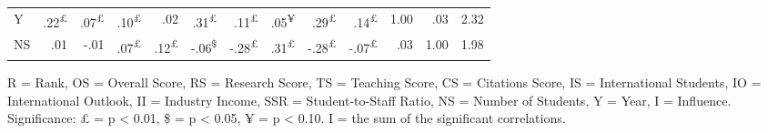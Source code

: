 \documentclass{singlecol-new}
\theoremstyle{TH}{
\newtheorem{lemma}{Lemma}
\newtheorem{theorem}[lemma]{Theorem}
\newtheorem{corrolary}[lemma]{Corrolary}
\newtheorem{conjecture}[lemma]{Conjecture}
\newtheorem{proposition}[lemma]{Proposition}
\newtheorem{claim}[lemma]{Claim}
\newtheorem{stheorem}[lemma]{Wrong Theorem}
\newtheorem{algorithm}{Algorithm}
}
\theoremstyle{THrm}{
\newtheorem{definition}{Definition}[section]
\newtheorem{question}{Question}[section]
\newtheorem{remark}{Remark}
\newtheorem{scheme}{Scheme}
}
\theoremstyle{THhit}{
\newtheorem{case}{Case}[section]
}
\begin{document}
\begin{table*}[h!]
\begin{tabular}{lrrrrrrrrrrrr}
		Y & \cellcolor{gray!11}.22\textsuperscript{£} & \cellcolor{gray!3}.07\textsuperscript{£} & \cellcolor{gray!5}.10\textsuperscript{£} & \cellcolor{gray!1}.02 & \cellcolor{gray!15}.31\textsuperscript{£} & \cellcolor{gray!5}.11\textsuperscript{£} & \cellcolor{gray!2}.05\textsuperscript{¥} & \cellcolor{gray!14}.29\textsuperscript{£} & \cellcolor{gray!7}.14\textsuperscript{£} & \cellcolor{gray!50}1.00 & \cellcolor{gray!1}.03 & 2.32 \\ 
		
		NS & \cellcolor{gray!0}.01 & \cellcolor{gray!0}-.01 & \cellcolor{gray!3}.07\textsuperscript{£} & \cellcolor{gray!6}.12\textsuperscript{£} & \cellcolor{gray!3}-.06\textsuperscript{\$} & \cellcolor{gray!14}-.28\textsuperscript{£} & \cellcolor{gray!15}.31\textsuperscript{£} & \cellcolor{gray!14}-.28\textsuperscript{£} & \cellcolor{gray!3}-.07\textsuperscript{£} & \cellcolor{gray!1}.03 & \cellcolor{gray!50}1.00 & 1.98 \\
		
	\end{tabular}
	
	\vspace{1mm}
	
	\scriptsize \raggedleft
	R = Rank, OS = Overall Score, RS = Research Score, TS = Teaching Score, CS = Citations Score, IS = International Students, IO = International Outlook, II = Industry Income, SSR = Student-to-Staff Ratio, NS = Number of Students, Y = Year, I = Influence. Significance: £ = p < 0.01, \$ = p < 0.05, ¥  = p < 0.10.  I = the sum of the significant correlations.
	
\end{table*}
\end{document}
